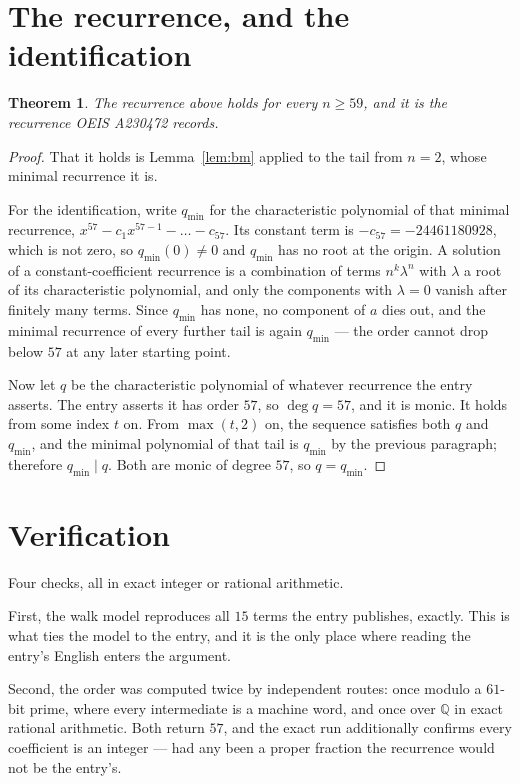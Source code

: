 \documentclass[11pt,a4paper]{article}
\theoremstyle{plain}
\newtheorem{theorem}{Theorem}
\theoremstyle{definition}
\begin{document}
\section{The recurrence, and the identification}

\begin{theorem}
The recurrence above holds for every $n\ge59$, and it is the recurrence OEIS A230472 records.
\end{theorem}

\begin{proof}
That it holds is Lemma~\ref{lem:bm} applied to the tail from $n=2$, whose minimal
recurrence it is.

For the identification, write $q_{\min}$ for the characteristic polynomial of that minimal
recurrence, $x^{57}-c_1x^{57-1}-\dots-c_{57}$. Its constant term is
$-c_{57}=-24461180928$, which is not zero, so $q_{\min}(0)\neq0$ and $q_{\min}$ has no
root at the origin. A solution of a constant-coefficient recurrence is a combination of terms
$n^{k}\lambda^{n}$ with $\lambda$ a root of its characteristic polynomial, and only the
components with $\lambda=0$ vanish after finitely many terms. Since $q_{\min}$ has none, no
component of $a$ dies out, and the minimal recurrence of every further tail is again
$q_{\min}$ --- the order cannot drop below $57$ at any later starting point.

Now let $q$ be the characteristic polynomial of whatever recurrence the entry asserts. The
entry asserts it has order $57$, so $\deg q=57$, and it is monic. It holds from some
index $t$ on. From $\max(t,2)$ on, the sequence satisfies both $q$ and $q_{\min}$, and
the minimal polynomial of that tail is $q_{\min}$ by the previous paragraph; therefore
$q_{\min}\mid q$. Both are monic of degree $57$, so $q=q_{\min}$.
\end{proof}

\section{Verification}

Four checks, all in exact integer or rational arithmetic.

First, the walk model reproduces all $15$ terms the entry publishes, exactly. This is
what ties the model to the entry, and it is the only place where reading the entry's English
enters the argument.

Second, the order was computed twice by independent routes: once modulo a $61$-bit prime, where
every intermediate is a machine word, and once over $\mathbb{Q}$ in exact rational arithmetic.
Both return $57$, and the exact run additionally confirms every coefficient is an integer
--- had any been a proper fraction the recurrence would not be the entry's.
\end{document}
